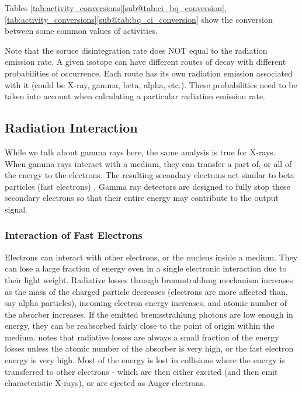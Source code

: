 \documentclass{article}
\begin{document}
Tables \ref{tab:activity_conversions}\ref{sub@tab:ci_bq_conversion}, \ref{tab:activity_conversions}\ref{sub@tab:bq_ci_conversion} show the conversion between some common values of activities.

Note that the soruce disintegration rate does NOT equal to the radiation emission rate. A given isotope can have different routes of decay with different probabilities of occurrence. Each route has its own 
radiation emission associated with it (could be X-ray, gamma, beta, alpha, etc.). These probabilities need to be taken into account when calculating a particular radiation emission rate.


\subsection{Radiation Interaction}


While we talk about gamma rays here, the same analysis is true for X-rays. When gamma rays interact with a medium, they can transfer a part of, or all of the energy to the electrons.
The resulting secondary electrons act similar to beta particles (fast electrons) \cite{Knoll2000}. Gamma ray detectors are designed to fully stop these secondary electrons so that their entire
energy may contribute to the output signal.

\subsubsection{Interaction of Fast Electrons}

Electrons can interact with other electrons, or the nucleus inside a medium. They can lose a large fraction of energy even in a single electronic interaction due to their light weight. 
Radiative losses through bremsstrahlung mechanism increases as the mass of the charged particle decreases (electrons are more affected than, say alpha particles), incoming electron energy increases,
and atomic number of the absorber increases. If the emitted bremsstrahlung photons are low enough in energy, they can be reabsorbed fairly close to the point of origin within the medium.
\cite{Knoll2000} notes that radiative losses are always a small fraction of the energy losses unless the atomic number of the absorber is very high, or the fast electron energy is very high. Most of the energy is lost in collisions where the energy is transferred to
other electrons - which are then either excited (and then emit characteristic X-rays), or are ejected as Auger electrons.
\end{document}
